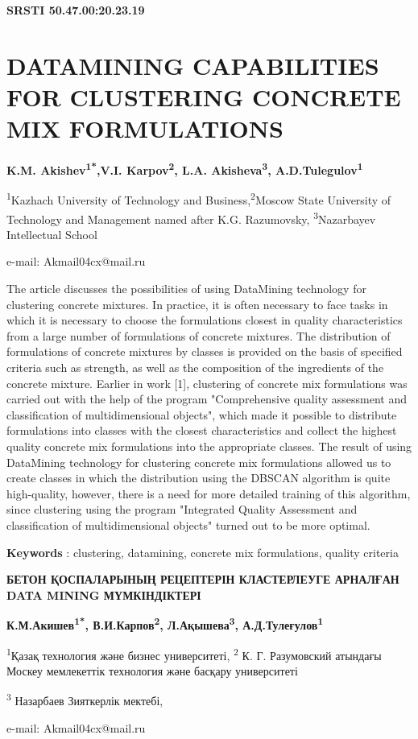 \clearpage
{\bfseries SRSTI 50.47.00:20.23.19}

\section{DATAMINING CAPABILITIES FOR CLUSTERING CONCRETE MIX
FORMULATIONS}

\begin{center}
{\bfseries K.M. Akishev\textsuperscript{1*},V.I. Karpov\textsuperscript{2},
L.A. Akisheva\textsuperscript{3}, A.D.Tulegulov\textsuperscript{1}}

\textsuperscript{1}Kazhach University of Technology and
Business,\textsuperscript{2}Moscow State University of Technology and
Management named after K.G. Razumovsky, \textsuperscript{3}Nazarbayev
Intellectual School

e-mail: Akmail04cx@mail.ru
\end{center}

The article discusses the possibilities of using DataMining technology
for clustering concrete mixtures. In practice, it is often necessary to
face tasks in which it is necessary to choose the formulations closest
in quality characteristics from a large number of formulations of
concrete mixtures. The distribution of formulations of concrete mixtures
by classes is provided on the basis of specified criteria such as
strength, as well as the composition of the ingredients of the concrete
mixture. Earlier in work {[}1{]}, clustering of concrete mix
formulations was carried out with the help of the program "Comprehensive
quality assessment and classification of multidimensional objects",
which made it possible to distribute formulations into classes with the
closest characteristics and collect the highest quality concrete mix
formulations into the appropriate classes. The result of using
DataMining technology for clustering concrete mix formulations allowed
us to create classes in which the distribution using the DBSCAN
algorithm is quite high-quality, however, there is a need for more
detailed training of this algorithm, since clustering using the program
"Integrated Quality Assessment and classification of multidimensional
objects" turned out to be more optimal.

{\bfseries Keywords} : clustering, datamining, concrete mix formulations,
quality criteria

\begin{center}
{\large\bfseries БЕТОН ҚОСПАЛАРЫНЫҢ РЕЦЕПТЕРІН КЛАСТЕРЛЕУГЕ АРНАЛҒАН DATA MINING
МҮМКІНДІКТЕРІ}

\vspace{1em}
{\bfseries К.М.Акишев\textsuperscript{1*}, В.И.Карпов\textsuperscript{2},
Л.Ақышева\textsuperscript{3}, А.Д.Тулеғулов\textsuperscript{1}}

\textsuperscript{1}Қазақ технология және бизнес университеті,
\textsuperscript{2} К. Г. Разумовский атындағы Москеу мемлекеттік
технология және басқару университеті

\textsuperscript{3} Назарбаев Зияткерлік мектебі,

e-mail: Akmail04cx@mail.ru
\end{center}

